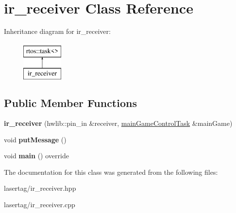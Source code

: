 \hypertarget{classir__receiver}{}\section{ir\+\_\+receiver Class Reference}
\label{classir__receiver}
Inheritance diagram for ir\+\_\+receiver\+:\begin{figure}[H]
\begin{center}
\leavevmode
\includegraphics[height=2.000000cm]{classir__receiver}
\end{center}
\end{figure}
\subsection*{Public Member Functions}
\begin{DoxyCompactItemize}
\item 
\mbox{\label{classir__receiver_a6dbdc36c8455ce5060a3f9e8357c1c57}} 
{\bfseries ir\+\_\+receiver} (hwlib\+::pin\+\_\+in \&receiver, \mbox{\hyperlink{classmain_game_control_task}{main\+Game\+Control\+Task}} \&main\+Game)
\item 
\mbox{\label{classir__receiver_add394c4222f6c90fe9efc6603db578f0}} 
void {\bfseries put\+Message} ()
\item 
\mbox{\label{classir__receiver_a402529e38e6c904095a98525c57f9c25}} 
void {\bfseries main} () override
\end{DoxyCompactItemize}


The documentation for this class was generated from the following files\+:\begin{DoxyCompactItemize}
\item 
lasertag/ir\+\_\+receiver.\+hpp\item 
lasertag/ir\+\_\+receiver.\+cpp\end{DoxyCompactItemize}
